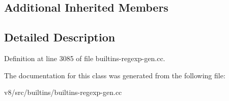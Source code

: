 \subsection*{Additional Inherited Members}


\subsection{Detailed Description}


Definition at line 3085 of file builtins-\/regexp-\/gen.\+cc.



The documentation for this class was generated from the following file\+:\begin{DoxyCompactItemize}
\item 
v8/src/builtins/builtins-\/regexp-\/gen.\+cc\end{DoxyCompactItemize}
